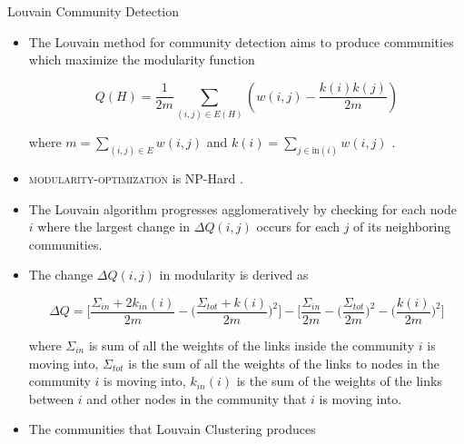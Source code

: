 \documentclass{beamer}
\begin{document}
\begin{frame}[allowframebreaks]{Louvain Community Detection}

\begin{itemize}
    \item The Louvain method for community detection aims to produce communities which maximize the modularity function 
    
    $$Q(H) = \frac {1}{2m} \sum_{(i, j) \in E(H)} \left ( w(i, j) - \frac {k(i) k(j)} {2m} \right )$$
    
    where $m = \sum_{(i, j) \in E} w(i,j)$ and $k(i) = \sum_{j \in \mathrm{in}(i)} w(i, j)$ . 
    
    \item \textsc{modularity-optimization} is NP-Hard \cite{modularity}.
    \item The Louvain algorithm progresses agglomeratively by checking for each node $i$ where the largest change in $\Delta Q (i, j) $ occurs for each $j$ of its neighboring communities. 
    \framebreak
    
    \item The change $\Delta Q(i, j)$ in modularity is derived as 
        
    \small {
    $$ \Delta Q = \bigg[ \frac{\Sigma_{in} + 2k_{in} (i)}{2m} - \bigg(\frac{\Sigma_{tot} + k(i)}{2m}\bigg)^2 \bigg]-\bigg[\frac{\Sigma_{in}}{2m} - \bigg(\frac{\Sigma_{tot}}{2m}\bigg)^2-\bigg(\frac{k(i)}{2m}\bigg)^2\bigg] $$
    }
        
    
    where $\Sigma_{in}$ is sum of all the weights of the links inside the community $i$ is moving into, $\Sigma_{tot}$ is the sum of all the weights of the links to nodes in the community $i$ is moving into, $k_{in} (i)$ is the sum of the weights of the links between $i$ and other nodes in the community that $i$ is  moving into.
    
    \item The communities that Louvain Clustering produces 
    
\end{itemize}

\end{frame}
\end{document}
